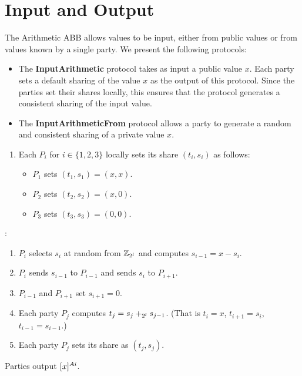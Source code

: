 \section{Input and Output}

The Arithmetic ABB allows values to be input, either from public values or from values known by a single party.
We present the following protocols:
\begin{itemize}
    \item The {\bf InputArithmetic} protocol takes as input a public value $x$.
    Each party sets a default sharing of the value $x$ as the output of this protocol. 
    Since the parties set their shares locally, this ensures that the protocol generates a consistent sharing of the input value.
    \item The {\bf InputArithmeticFrom} protocol allows a party to generate a random and consistent sharing of a private value $x$.
\end{itemize}

\begin{protocol}[Input]
	\begin{enumerate}
        \item Each $P_i$ for $i \in \{1, 2, 3\}$ locally sets its share $(t_i, s_i)$ as follows:
        \begin{itemize}
            \item $P_1$ sets $(t_1, s_1) = (x, x)$.
            \item $P_2$ sets $(t_2, s_2) = (x, 0)$.
            \item $P_3$ sets $(t_3, s_3) = (0, 0)$. 
        \end{itemize}
	\end{enumerate}

	\noindent {}:
	\begin{enumerate}
		\item $P_i$ selects $s_i$ at random from $\mathbb{Z}_{2^l}$ and computes $s_{i - 1} = x - s_i$.
		\item $P_i$ sends $s_{i - 1}$ to $P_{i - 1}$ and sends $s_i$ to $P_{i + 1}$.
		\item $P_{i-1}$ and $P_{i+1}$ set $s_{i+1} = 0$.
		\item Each party $P_j$ computes $t_j = s_j +_{2^l} s_{j - 1}$.
			(That is $t_i = x$, $t_{i + 1} = s_{i}$, $t_{i - 1} = s_{i - 1}$.)
		\item Each party $P_j$ sets its share as $(t_j, s_j)$.
	\end{enumerate}
		Parties output $[x]^{Ai}$.
\end{protocol}

